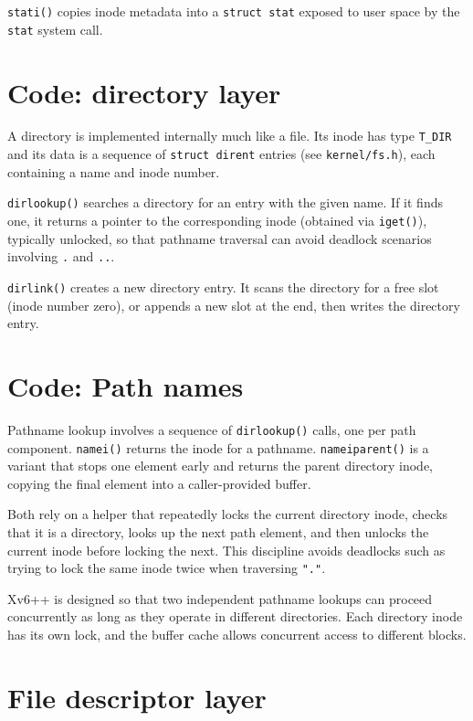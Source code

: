 \lstinline{stati()} copies inode metadata into a \lstinline{struct stat} exposed to user space by the \lstinline{stat} system call.

\section{Code: directory layer}

A directory is implemented internally much like a file. Its inode has type \lstinline{T_DIR}
and its data is a sequence of \lstinline{struct dirent} entries (see \texttt{kernel/fs.h}),
each containing a name and inode number.

\lstinline{dirlookup()} searches a directory for an entry with the given name. If it finds one,
it returns a pointer to the corresponding inode (obtained via \lstinline{iget()}), typically unlocked,
so that pathname traversal can avoid deadlock scenarios involving \lstinline{.} and \lstinline{..}.

\lstinline{dirlink()} creates a new directory entry. It scans the directory for a free slot (inode number zero),
or appends a new slot at the end, then writes the directory entry.

\section{Code: Path names}

Pathname lookup involves a sequence of \lstinline{dirlookup()} calls, one per path component.
\lstinline{namei()} returns the inode for a pathname.
\lstinline{nameiparent()} is a variant that stops one element early and returns the parent directory inode,
copying the final element into a caller-provided buffer.

Both rely on a helper that repeatedly locks the current directory inode, checks that it is a directory,
looks up the next path element, and then unlocks the current inode before locking the next.
This discipline avoids deadlocks such as trying to lock the same inode twice when traversing \lstinline{"."}.

Xv6++ is designed so that two independent pathname lookups can proceed concurrently as long as they operate
in different directories. Each directory inode has its own lock, and the buffer cache allows concurrent access
to different blocks.

\section{File descriptor layer}

